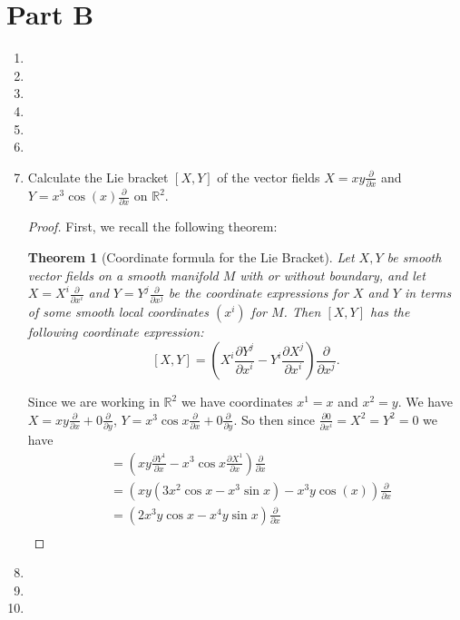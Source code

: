 \documentclass{article}
\newtheorem*{theorem}{Theorem}
\begin{document}
\section*{Part B}
\begin{enumerate}
	\item	 
	
	\item 
	
	\item
	
	\item
	
	\item
	
	\item
	
	\item Calculate the Lie bracket $[X,Y]$ of the vector fields $X = xy \frac{\partial}{\partial x}$ and $Y = x^3 \cos(x) \frac{\partial}{\partial x}$ on $\mathbb{R}^2$.
		\begin{proof}
		
		First, we recall the following theorem:
			\begin{theorem}[Coordinate formula for the Lie Bracket]
	Let $X,Y$ be smooth vector fields on a smooth manifold $M$ with or without boundary, and let $X = X^i \frac{\partial}{\partial x^i}$
	and $Y = Y^j \frac{\partial}{\partial x^j}$ be the coordinate expressions for $X$ and $Y$ in terms of some smooth local
	coordinates $(x^i)$ for $M$. Then $[X,Y]$ has the following coordinate expression:
	\[ [X,Y] = \left ( X^i \frac{ \partial Y^j}{\partial x^i} - Y^i \frac{\partial X^j}{\partial x^i} \right ) \frac{\partial }{ \partial x^j} .\]
\end{theorem}

Since we are working in $\mathbb{R}^2$ we have coordinates $x^1 = x$ and $x^2 = y$.
We have $X = xy \frac{\partial}{\partial x} + 0 \frac{\partial}{\partial y}$, $Y = x^3 \cos x \frac{\partial}{\partial x} + 0 \frac{\partial}{\partial y}$.
So then since $\frac{\partial 0 }{\partial x^i} = X^2 = Y^2 = 0$ we have
\begin{align*}
[X, Y] &= \left (xy \frac{\partial Y^1}{\partial x} - x^3 \cos x \frac{\partial X^1}{\partial x} \right ) \frac{\partial}{\partial x} \\
%
&=  \left (xy (3x^2 \cos x - x^3 \sin x) - x^3 y \cos (x)  \right ) \frac{\partial}{\partial x} \\
&=  \left (2x^3y \cos x - x^4y \sin x \right ) \frac{\partial}{\partial x} \\
\end{align*}
		\end{proof}
	
	\item
	
	\item
	
	\item 
\end{enumerate}
\end{document}
